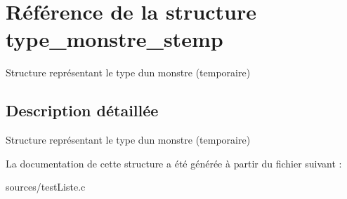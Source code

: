 \hypertarget{structtype__monstre__stemp}{}\section{Référence de la structure type\+\_\+monstre\+\_\+stemp}
\label{structtype__monstre__stemp}


Structure représentant le type d\textquotesingle{}un monstre (temporaire)  




\subsection{Description détaillée}
Structure représentant le type d\textquotesingle{}un monstre (temporaire) 

La documentation de cette structure a été générée à partir du fichier suivant \+:\begin{DoxyCompactItemize}
\item 
sources/test\+Liste.\+c\end{DoxyCompactItemize}
